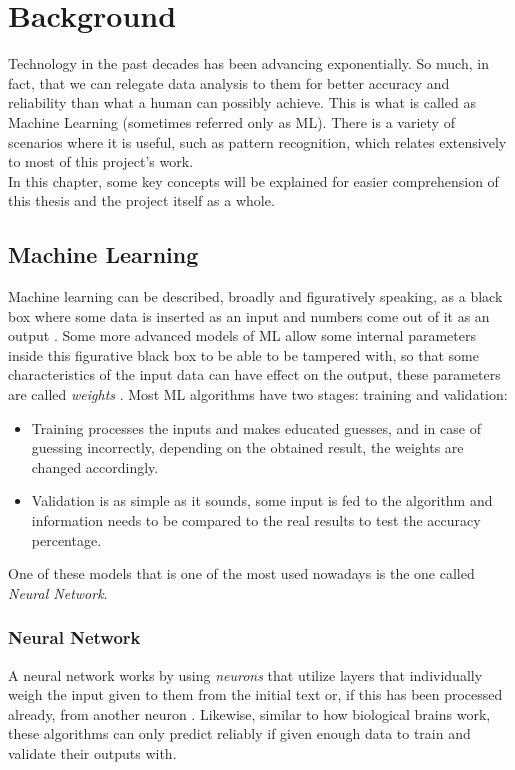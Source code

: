\chapter{Background}
Technology in the past decades has been advancing exponentially. So much, in fact, that we can relegate data analysis to them for better accuracy and reliability than what a human can possibly achieve. This is what is called as Machine Learning (sometimes referred only as ML).
There is a variety of scenarios where it is useful, such as pattern recognition, which relates extensively to most of this project's work.\\
In this chapter, some key concepts will be explained for easier comprehension of this thesis and the project itself as a whole.

\section{Machine Learning}
Machine learning can be described, broadly and figuratively speaking, as a black box where some data is inserted as an input and numbers come out of it as an output \citep{rf8}.
Some more advanced models of ML allow some internal parameters inside this figurative black box to be able to be tampered with, so that some characteristics of the input data can have effect on the output, these parameters are called \textit{weights} \citep{rf9}.
Most ML algorithms have two stages: training and validation:
\begin{itemize}
\item Training processes the inputs and makes educated guesses, and in case of guessing incorrectly, depending on the obtained result, the weights are changed accordingly.
\item Validation is as simple as it sounds, some input is fed to the algorithm and information needs to be compared to the real results to test the accuracy percentage.
\end{itemize}
One of these models that is one of the most used nowadays is the one called \textit{Neural Network}.

\subsection{Neural Network}
A neural network works by using \textit{neurons} that utilize layers that individually weigh the input given to them from the initial text or, if this has been processed already, from another neuron \citep{rf9}.
Likewise, similar to how biological brains work, these algorithms can only predict reliably if given enough data to train and validate their outputs with.

